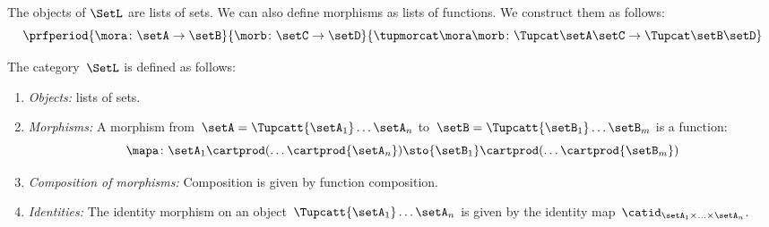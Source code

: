 The objects of $\SetL$ are lists of sets.
We can also define morphisms as lists of functions.
We construct them as follows:
%
\begin{equation}
    \label{eq:sets-monoid-maps2}
    \prfperiod{
        \mora \colon \setA \to \setB
    }{
        \morb \colon \setC \to \setD
    }{
        \tupmorcat \mora \morb \colon \Tupcat \setA   \setC \to \Tupcat \setB  \setD
    }
\end{equation}
%

\begin{definition}
    \label{def:SetL}
    The category~$\SetL$ is defined as follows:
    \begin{enumerate}
        \item \emph{Objects:} lists of sets.
        \item \emph{Morphisms:}
              A morphism from~$\setA =\Tupcatt {\setA_1}  \dots {\setA_n}$ to~$\setB = \Tupcatt {\setB_1} \dots {\setB_m}$ is a function:
              \begin{equation*}
                  \mapa\colon {\setA_1} \cartprod (\ldots \cartprod {\setA_n}) \sto {\setB_1} \cartprod (\ldots \cartprod {\setB_m})
              \end{equation*}
        \item \emph{Composition of morphisms:}
              Composition is given by function composition.
        \item \emph{Identities:}
              The identity morphism on an object~$\Tupcatt {\setA_1} \dots {\setA_n}$ is given by the identity map~$\catid_{\setA_1\times \ldots \times \setA_n}$.
    \end{enumerate}
\end{definition}

